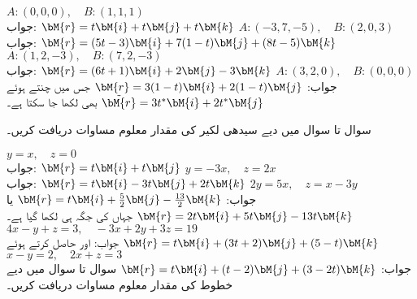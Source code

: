  \quad
$A:(0,0,0),\quad B:(1,1,1)$\\
جواب:
$\bM{r}=t\bM{i}+t\bM{j}+t\bM{k}$
\quad
$A:(-3,7,-5),\quad B:(2,0,3)$\\
جواب:
$\bM{r}=(5t-3)\bM{i}+7(1-t)\bM{j}+(8t-5)\bM{k}$
\quad
$A:(1,2,-3),\quad B:(7,2,-3)$\\
جواب:
$\bM{r}=(6t+1)\bM{i}+2\bM{j}-3\bM{k}$
\quad
$A:(3,2,0),\quad B:(0,0,0)$\\
جواب:
$\bM{r}=3(1-t)\bM{i}+2(1-t)\bM{j}$
 جس میں  چنتے ہوئے 
$\tilde{\bM{r}}=3t^*\bM{i}+2t^*\bM{j}$
 بھی لکھا جا سکتا ہے۔

سوال  تا سوال  میں دیے سیدھی لکیر کی مقدار معلوم مساوات دریافت کریں۔

\quad
$y=x,\quad z=0$\\
جواب:
$\bM{r}=t\bM{i}+t\bM{j}$
\quad
$y=-3x,\quad z=2x$\\
جواب:
$\bM{r}=t\bM{i}-3t\bM{j}+2t\bM{k}$
\quad
$2y=5x,\quad z=x-3y$\\
جواب:
$\bM{r}=t\bM{i}+\tfrac{5}{2}\bM{j}-\tfrac{13}{2}\bM{k}$ \quad 
یا \quad 
$\bM{r}=2t\bM{i}+5t\bM{j}-13t\bM{k}$\quad 
جہاں  کی جگہ  ہی لکھا گیا ہے۔
\quad
$4x-y+z=3,\quad -3x+2y+3z=19$\\
جواب: اور  حاصل کرتے ہوئے  \quad
$\bM{r}=t\bM{i}+(3t+2)\bM{j}+(5-t)\bM{k}$
\quad
$x-y=2,\quad 2x+z=3$\\
جواب:
$\bM{r}=t\bM{i}+(t-2)\bM{j}+(3-2t)\bM{k}$
سوال  تا سوال  میں دیے خطوط کی مقدار معلوم مساوات دریافت کریں۔

